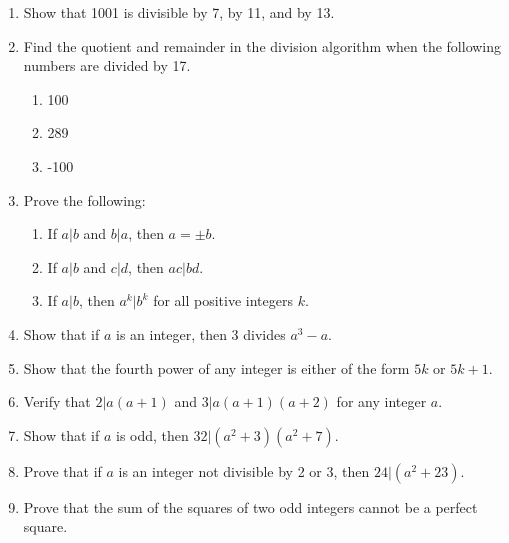 \documentclass{article}
\begin{document}
\begin{enumerate}
	\item
		Show that 1001 is divisible by 7, by 11, and by 13.
	\item
		Find the quotient and remainder in the division algorithm when the following numbers are divided by 17.
		\begin{enumerate}
			\item
				100
			\item
				289
			\item
				-100
		\end{enumerate}
	\item
		Prove the following:
		\begin{enumerate}
			\item
				If $a|b$ and $b|a$, then $a = \pm b$.
			\item
				If $a|b$ and $c|d$, then $ac | bd$.
			\item
				If $a|b$, then $a^k | b^k$ for all positive integers $k$.
		\end{enumerate}
	\item
		Show that if $a$ is an integer, then 3 divides $a^3 - a$.
	\item
		Show that the fourth power of any integer is either of the form $5k$ or $5k + 1$.
	\item
		Verify that $2 | a(a + 1)$ and $3 | a(a + 1)(a + 2)$ for any integer $a$.
	\item
		Show that if $a$ is odd, then $32 | (a^2 + 3)(a^2 + 7)$.
	\item
		Prove that if $a$ is an integer not divisible by 2 or 3, then $24 | (a^2 + 23)$.
	\item
		Prove that the sum of the squares of two odd integers cannot be a perfect square.
\end{enumerate}

\pagebreak
\end{document}

